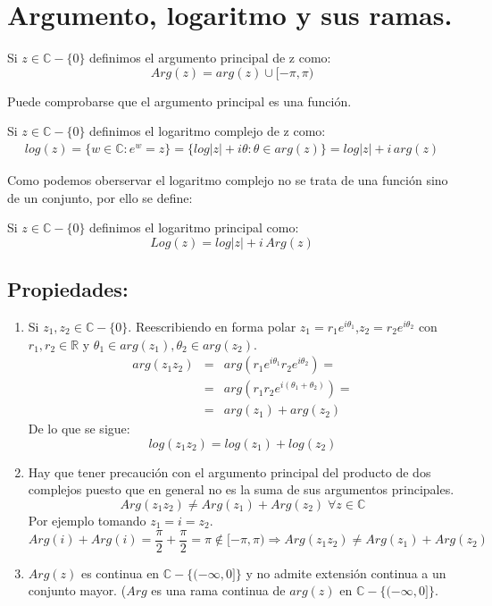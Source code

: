 
\section{Argumento, logaritmo y sus ramas.}

Si \(z \in \mathbb{C}-\{0\}\) definimos el argumento principal de z como:
\[Arg(z) = arg(z) \cup [-\pi, \pi)\]

Puede comprobarse que el argumento principal es una función.

\begin{definicion}
Si \(z \in \mathbb{C}-\{0\}\) definimos el logaritmo complejo de z como:
\begin{eqnarray*}
  log(z) = \{w\in \mathbb{C} : e^w=z\} = \{log |z| + i\theta : \theta \in arg(z)\} = log|z| +i\,arg(z)
\end{eqnarray*}
\end{definicion}

Como podemos oberservar el logaritmo complejo no se trata de una función sino de un conjunto, por ello se define:

\begin{definicion}
 Si \(z \in \mathbb{C}-\{0\}\) definimos el logaritmo principal como:
 \[ Log(z) = log|z|+i\,Arg(z)\]
\end{definicion}

\subsection{Propiedades:}

\begin{enumerate}
  \item Si \(z_1,z_2 \in \mathbb{C}-\{0\}\). Reescribiendo en forma polar \(z_1=r_1e^{i\theta_1}\),\(z_2=r_2e^{i\theta_2}\) con \(r_1,r_2 \in \mathbb{R}\) y \(\theta_1\in arg(z_1),\theta_2 \in arg(z_2)\).
    \begin{eqnarray*}
      arg(z_1z_2) & = & arg(r_1e^{i\theta_1} r_2e^{i\theta_2}) = \\ 
                  & = & arg(r_1r_2e^{i(\theta_1+\theta_2)}) = \\
                  & = & arg(z_1)+arg(z_2)
    \end{eqnarray*}
    De lo que se sigue:
    \[ log(z_1z_2) = log(z_1)+log(z_2)\]

  \item Hay que tener precaución con el argumento principal del producto de dos complejos puesto que en general no es la suma de sus argumentos principales.
    \[Arg(z_1z_2) \neq Arg(z_1)+Arg(z_2) \; \forall z \in \mathbb{C}\]
    Por ejemplo tomando \(z_1 = i = z_2\).
    \[ Arg(i)+Arg(i) = \frac{\pi}{2}+\frac{\pi}{2} = \pi \not\in [-\pi, \pi) \Rightarrow Arg(z_1z_2) \neq Arg(z_1)+Arg(z_2)\]
  \item \(Arg(z)\) es continua en \(\mathbb{C}-\{(-\infty,0]\}\) y no admite extensión continua a un conjunto mayor.
    (\(Arg\) es una rama continua de \(arg(z)\) en \(\mathbb{C}-\{(-\infty,0]\}\).
\end{enumerate}


